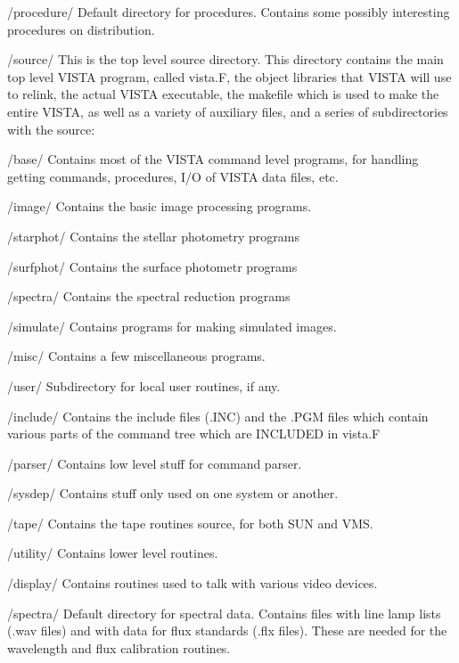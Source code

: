           /procedure/     Default directory for procedures. Contains some
                          possibly interesting procedures on distribution.

          /source/    This is the top level source directory. This directory
                          contains the main top level VISTA program, called
                          vista.F, the object libraries that VISTA
                          will use to relink, the actual VISTA executable,
                          the makefile which is used to make the entire VISTA,
                          as well as a variety of auxiliary files, and a
                          series of subdirectories with the source:

                  /base/     Contains most of the VISTA command level programs,
				for handling getting commands, procedures,
				I/O of VISTA data files, etc.

		  /image/    Contains the basic image processing programs.

                  /starphot/ Contains the stellar photometry programs

		  /surfphot/ Contains the surface photometr programs

		  /spectra/  Contains the spectral reduction programs

		  /simulate/ Contains programs for making simulated images.

		  /misc/     Contains a few miscellaneous programs.

		  /user/     Subdirectory for local user routines, if any.

                  /include/  Contains the include files (.INC) and the
                               .PGM files which contain various parts of
                               the command tree which are INCLUDED in vista.F

                  /parser/   Contains low level stuff for command parser.

                  /sysdep/   Contains stuff only used on one system or another.

                  /tape/     Contains the tape routines source, for both SUN
                               and VMS.

                  /utility/  Contains lower level routines.

                  /display/  Contains routines used to talk with various
                               video devices.

          /spectra/       Default directory for spectral data. Contains files
                          with line lamp lists (.wav files) and with data
                          for flux standards (.flx files). These are needed
                          for the wavelength and flux calibration routines.

